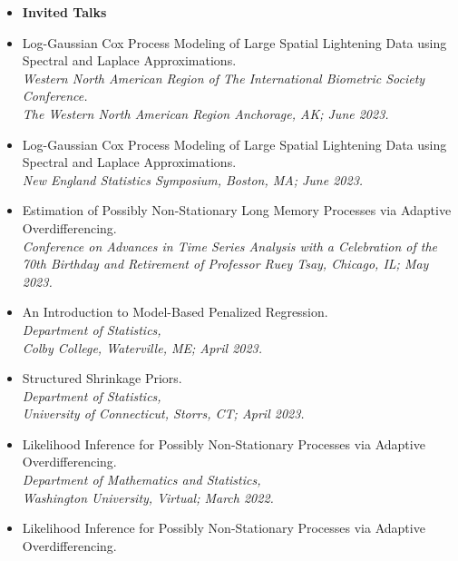 \documentclass[11pt]{article}
\newcommand{\tab}{\hspace*{2em}}
\begin{document}
\begin{itemize}
	\item[] \textbf{Invited Talks} \vspace{-2mm}
	\item[] Log-Gaussian Cox Process Modeling of Large Spatial Lightening Data using Spectral and Laplace Approximations. \\
	\tab \emph{Western North American Region of The International Biometric Society Conference.} \\
	\tab \emph{The Western North American Region Anchorage, AK; June 2023.}\vspace{-2mm}
	\item[] Log-Gaussian Cox Process Modeling of Large Spatial Lightening Data using Spectral and Laplace Approximations. \\
	\tab \emph{New England Statistics Symposium, Boston, MA; June 2023.}\vspace{-2mm}
	\item[] Estimation of Possibly Non-Stationary Long Memory Processes via Adaptive Overdifferencing. \\
	\tab \emph{Conference on Advances in Time Series Analysis with a Celebration of the} \\
	\tab \emph{70th Birthday and Retirement of Professor Ruey Tsay, Chicago, IL; May 2023.} \vspace{-2mm}
	\item[] An Introduction to Model-Based Penalized Regression. \\
	\tab \emph{Department of Statistics,} \\
	\tab \emph{Colby College, Waterville, ME; April 2023.} \vspace{-2mm}
	\item[] Structured Shrinkage Priors. \\
	\tab \emph{Department of Statistics,} \\
	\tab \emph{University of Connecticut, Storrs, CT; April 2023.} \vspace{-2mm}
	\item[] Likelihood Inference for Possibly Non-Stationary Processes via Adaptive Overdifferencing. \\
	\tab \emph{Department of Mathematics and Statistics,} \\
	\tab \emph{Washington University, Virtual; March 2022.} \vspace{-2mm}
	\item[] Likelihood Inference for Possibly Non-Stationary Processes via Adaptive Overdifferencing. \\

\end{itemize}
\end{document}
